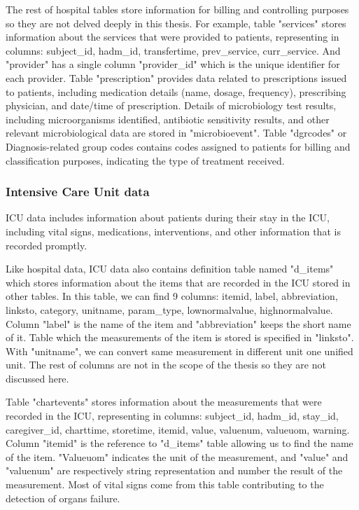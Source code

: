 \documentclass[../main.tex]{subfiles}
\begin{document}
The rest of hospital tables store information for billing and controlling purposes so they are not delved deeply in this thesis.
For example, table "services" stores information about the services that were provided to patients, representing in columns: subject\_id, hadm\_id, transfertime, prev\_service, curr\_service. 
And "provider" has a single column "provider\_id" which is the unique identifier for each provider.
Table "prescription" provides data related to prescriptions issued to patients, including medication details (name, dosage, frequency), prescribing physician, and date/time of prescription.
Details of microbiology test results, including microorganisms identified, antibiotic sensitivity results, and other relevant microbiological data are stored in "microbioevent".
Table "dgrcodes" or Diagnosis-related group codes contains codes assigned to patients for billing and classification purposes, indicating the type of treatment received.


\subsubsection{Intensive Care Unit data}

ICU data includes information about patients during their stay in the ICU, including vital signs, medications, interventions, and other information that is recorded promptly.

Like hospital data, ICU data also contains definition table named "d\_items" which stores information about the items that are recorded in the ICU stored in other tables. 
In this table, we can find 9 columns: itemid, label, abbreviation, linksto, category, unitname, param\_type, lownormalvalue, highnormalvalue.
Column "label" is the name of the item and "abbreviation" keeps the short name of it.
Table which the measurements of the item is stored is specified in "linksto".
With "unitname", we can convert same measurement in different unit one unified unit.
The rest of columns are not in the scope of the thesis so they are not discussed here.

Table "chartevents" stores information about the measurements that were recorded in the ICU, representing in columns: subject\_id, hadm\_id, stay\_id, caregiver\_id, charttime, storetime, itemid, value, valuenum, valueuom, warning.
Column "itemid" is the reference to "d\_items" table allowing us to find the name of the item.
"Valueuom" indicates the unit of the measurement, and "value" and "valuenum" are respectively string representation and number the result of the measurement.
Most of vital signs come from this table contributing to the detection of organs failure.
\end{document}
